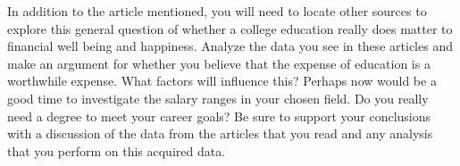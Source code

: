 \documentclass{article}
\begin{document}
In addition to the article mentioned, you will need to locate other sources to explore this
general question of whether a college education really does matter to financial well being
and happiness.  Analyze the data you see in these articles and make an argument for whether 
    you believe that the expense of education is a worthwhile expense.  What factors will influence this? Perhaps now would be a good time to investigate the salary ranges in your chosen field.  Do you really need a degree to meet your career goals? Be sure to support your conclusions with a discussion of the data from the articles that you read and any analysis that you perform on this acquired data.
\end{document}
